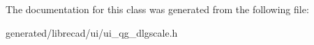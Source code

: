 The documentation for this class was generated from the following file\-:\begin{DoxyCompactItemize}
\item 
generated/librecad/ui/ui\-\_\-qg\-\_\-dlgscale.\-h\end{DoxyCompactItemize}
